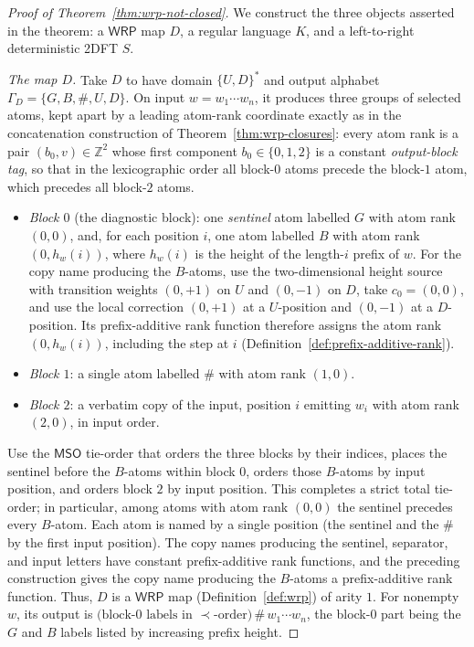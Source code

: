 \documentclass[11pt]{article}
\theoremstyle{definition}
\newcommand{\Z}{\mathbb Z}
\newcommand{\WRP}{\mathsf{WRP}}
\newcommand{\MSO}{\mathsf{MSO}}
\begin{document}
\begin{proof}[Proof of Theorem~\ref{thm:wrp-not-closed}]
We construct the three objects asserted in the theorem: a $\WRP$ map $D$, a
regular language $K$, and a left-to-right deterministic 2DFT $S$.

\vspace{0.5em}
\noindent\emph{The map $D$.}
Take $D$ to have domain $\{U,D\}^*$ and output alphabet
$\Gamma_D=\{G,B,\#,U,D\}$.  On input
$w=w_1\cdots w_n$, it produces three groups of selected atoms, kept apart by a
leading atom-rank coordinate exactly as in the concatenation construction of
Theorem~\ref{thm:wrp-closures}: every atom rank is a pair
$(b_0,v)\in\Z^2$ whose first component $b_0\in\{0,1,2\}$ is a constant
\emph{output-block tag}, so that in the lexicographic order all block-$0$ atoms
precede the block-$1$ atom, which precedes all block-$2$ atoms.
\begin{itemize}
\item \emph{Block $0$} (the diagnostic block): one \emph{sentinel} atom labelled
$G$ with atom rank $(0,0)$, and, for each position $i$, one atom labelled $B$
with atom rank
$(0,h_w(i))$, where $h_w(i)$ is the height of the length-$i$ prefix of $w$.
For the copy name producing the $B$-atoms, use the two-dimensional height
source with transition weights
$(0,+1)$ on $U$ and $(0,-1)$ on $D$, take $c_0=(0,0)$, and use the local
correction $(0,+1)$ at a $U$-position and $(0,-1)$ at a $D$-position.  Its
prefix-additive rank function therefore assigns the atom rank $(0,h_w(i))$,
including the step at $i$
(Definition~\ref{def:prefix-additive-rank}).
\item \emph{Block $1$}: a single atom labelled $\#$ with atom rank $(1,0)$.
\item \emph{Block $2$}: a verbatim copy of the input, position $i$ emitting
$w_i$ with atom rank $(2,0)$, in input order.
\end{itemize}
Use the $\MSO$ tie-order that orders the three blocks by their indices, places
the sentinel before the $B$-atoms within block $0$, orders those $B$-atoms by
input position, and orders block $2$ by input position.  This completes a
strict total tie-order; in particular, among atoms with atom rank $(0,0)$ the
sentinel precedes every $B$-atom.
Each atom is named by a single position (the sentinel and the $\#$ by the
first input position).  The copy names producing the sentinel, separator, and
input letters have constant prefix-additive rank functions, and the preceding
construction gives the copy name producing the $B$-atoms a prefix-additive rank
function.  Thus, $D$ is a $\WRP$ map
(Definition~\ref{def:wrp}) of
arity $1$.  For nonempty $w$, its output is
$\bigl(\text{block-}0\text{ labels in }\prec\text{-order}\bigr)\,\#\,w_1\cdots w_n$,
the block-$0$ part being the $G$ and $B$ labels listed by increasing prefix
height.


\end{proof}
\end{document}

